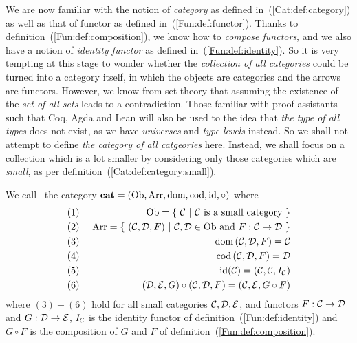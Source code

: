 We are now familiar with the notion of {\em category} as defined
in~(\ref{Cat:def:category}) as well as that of functor as defined
in~(\ref{Fun:def:functor}). Thanks to definition~(\ref{Fun:def:composition}),
we know how to {\em compose functors}, and we also have a notion of
{\em identity functor} as defined in~(\ref{Fun:def:identity}). So it is
very tempting at this stage to wonder whether the {\em collection of all
categories} could be turned into a category itself, in which the objects
are categories and the arrows are functors. However, we know from set theory 
that assuming the existence of the {\em set of all sets} leads to a 
contradiction. Those familiar with proof assistants such that Coq, Agda
and Lean will also be used to the idea that {\em the type of all types}
does not exist, as we have {\em universes} and {\em type levels} instead.
So we shall not attempt to define {\em the category of all catgeories} here.
Instead, we shall focus on a collection which is a lot smaller by considering
only those categories which are {\em small}, as per 
definition~(\ref{Cat:def:category:small}).

\begin{defin}\label{Fun:def:category:small:cat}
    We call \cat\ the category $\mbox{\bf cat}=(\mbox{\rm Ob}, \mbox{\rm Arr}, \mbox{\rm dom}, \mbox{\rm cod}, \mbox{\rm id}, \circ)$ where
    \begin{eqnarray*}
        (1)&\ &\ob = \{\ \Cat\ |\ \mbox{\Cat\ is a small category}\ \}\\
        (2)&\ &\arr =\{\ (\Cat,\Dat,F)\ |\ \Cat,\Dat\in\ob\ 
        \mbox{and}\ F:\Cat\to\Dat\ \}\\
        (3)&\ &\dom\,(\Cat,\Dat,F)=\Cat\\
        (4)&\ &\cod\,(\Cat,\Dat,F)=\Dat\\
        (5)&\ &\id(\Cat)=(\Cat,\Cat,I_{\cal C})\\
        (6)&\ &(\Dat,\Eat,G) \circ (\Cat,\Dat,F) = (\Cat,\Eat,G\circ F)
    \end{eqnarray*}
    where $(3)-(6)$ hold for all small categories $\mbox{$\cal C$},\mbox{$\cal D$},\mbox{$\cal E$}$, and
    functors $F:\mbox{$\cal C$}\to\mbox{$\cal D$}$ and $G:\mbox{$\cal D$}\to\mbox{$\cal E$}$, $I_{\cal C}$ is the identity
    functor of definition~(\ref{Fun:def:identity}) and $G\circ F$ is the 
    composition of $G$ and $F$ of definition~(\ref{Fun:def:composition}).
\end{defin}
